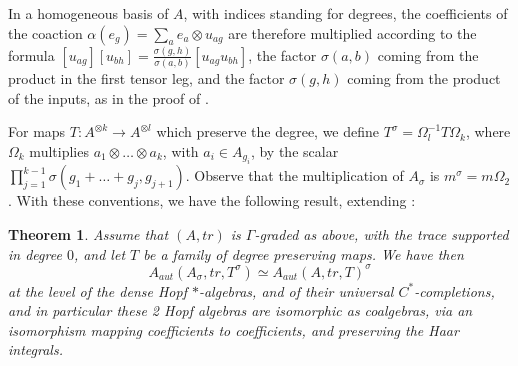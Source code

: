 \documentclass[11pt]{amsart}
\newtheorem{theorem}{Theorem}[section]
\theoremstyle{definition}
\begin{document}
In a homogeneous basis of $A$, with indices standing for degrees, the coefficients of the coaction $\alpha(e_g)=\sum_ae_a\otimes u_{ag}$ are therefore multiplied according to the formula $[u_{ag}][u_{bh}]=\frac{\sigma(g,h)}{\sigma(a,b)}[u_{ag}u_{bh}]$, the factor $\sigma(a,b)$ coming from the product in the first tensor leg, and the factor $\sigma(g,h)$ coming from the product of the inputs, as in the proof of \cite[Theorem 1.3]{bbc}.

For maps $T:A^{\otimes k}\to A^{\otimes l}$ which preserve the degree, we define $T^\sigma=\Omega_l^{-1}T\Omega_k$, where $\Omega_k$ multiplies $a_1\otimes\ldots\otimes a_k$, with $a_i\in A_{g_i}$, by the scalar $\prod_{j=1}^{k-1}\sigma(g_1+\ldots+g_j,g_{j+1})$. Observe that the multiplication of $A_\sigma$ is $m^\sigma=m\Omega_2$. With these conventions, we have the following result, extending \cite{bbc}:

\begin{theorem}
Assume that $(A,tr)$ is $\Gamma$-graded as above, with the trace supported in degree $0$, and let $T$ be a family of degree preserving maps. We have then
$$A_{aut}(A_\sigma,tr,T^\sigma)\simeq A_{aut}(A,tr,T)^\sigma$$
at the level of the dense Hopf $*$-algebras, and of their universal $C^*$-completions, and in particular these 2 Hopf algebras are isomorphic as coalgebras, via an isomorphism mapping coefficients to coefficients, and preserving the Haar integrals.
\end{theorem}
\end{document}
